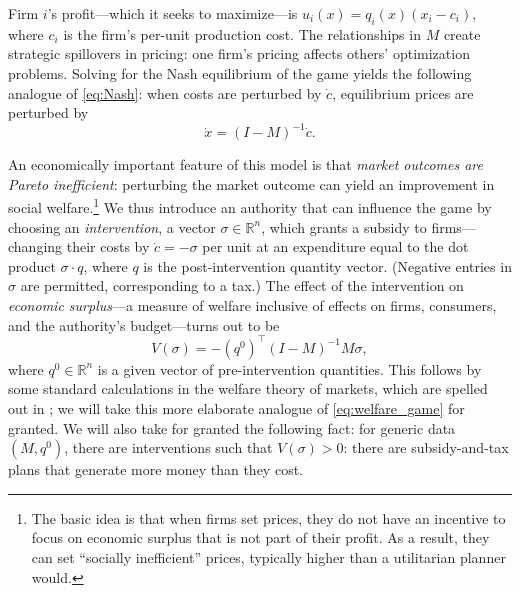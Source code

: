 \documentclass{notices}
\theoremstyle{definition}\newtheorem{problem}{Problem}
\theoremstyle{definition} \newtheorem{remark}{Remark}
\theoremstyle{definition} \newtheorem{claim}{Claim}
\theoremstyle{definition} \newtheorem{thm}{Theorem}
\theoremstyle{definition} \newtheorem*{thmNoNum}{Theorem}
\theoremstyle{definition} \newtheorem{definition}{Definition}
\theoremstyle{definition} \theoremstyle{remark}
\theoremstyle{definition} \newtheorem{note}{Note}
\theoremstyle{definition} \newtheorem{notation}{Notation}
\theoremstyle{definition} \theoremstyle{plain}
\theoremstyle{definition} \newtheorem{condition}{Condition}
\theoremstyle{definition} \newtheorem{lem}{Lemma}
\theoremstyle{definition} \newtheorem{corollary}{Corollary}
\theoremstyle{definition} \newtheorem{prop}{Proposition}
\theoremstyle{definition} \newtheorem{ax}{Axiom}
\theoremstyle{definition} \newtheorem{assumption}{Assumption}
\theoremstyle{definition} \newtheorem{example}{Example}
\theoremstyle{definition} \newtheorem{rmk}{Remark}
\theoremstyle{definition} \newtheorem{res}{Result}
\theoremstyle{definition} \newtheorem{que}{Question}
\theoremstyle{definition} \newtheorem{conjecture}{Conjecture}
\theoremstyle{definition}
\begin{document}
Firm $i$'s profit---which it seeks to maximize---is $ u_i(x) = q_i(x)(x_i-c_i),$ where $c_i$ is the firm's per-unit production cost. The relationships in $M$ create strategic spillovers in pricing: one firm's pricing affects others' optimization problems. Solving for the Nash equilibrium of the game yields the following analogue of \cref{eq:Nash}: when costs are perturbed by $\dot{c}$, equilibrium prices are perturbed by $$ \dot{x} = (I-M)^{-1} \dot{c}.$$ 

An economically important feature of this model is that \emph{market outcomes are Pareto inefficient}: perturbing the market outcome can yield an improvement in social welfare.\footnote{The basic idea is that when firms set prices, they do not have an incentive to focus on economic surplus that is not part of their profit. As a result, they can set ``socially inefficient'' prices, typically higher than a utilitarian planner would.} We thus introduce an authority that can influence the game by choosing an \emph{intervention}, a vector \( \sigma  \in \mathbb{R}^n\), which grants a subsidy to firms---changing  their costs by $\dot{c}=-\sigma$ per unit at an expenditure equal to the dot product $\sigma \cdot q$, where $q$ is the post-intervention quantity vector. (Negative entries in $\sigma$ are permitted, corresponding to a tax.)  The effect of the intervention on \emph{economic surplus}---a measure of welfare inclusive of effects on firms, consumers, and the authority's budget---turns out to be
\begin{equation}
V(\sigma) = -(q^0)^\top (I - M)^{-1} M \sigma, \label{eq:welfare_market}
\end{equation} where $q^0 \in \mathbb{R}^n$ is a given vector of pre-intervention quantities. This follows by some standard  calculations in the welfare theory of markets, which are spelled out in \cite{GaleottiGolubGoyalTalamasTamuz2026}; we will take this more elaborate analogue of \cref{eq:welfare_game} for granted. We will also take for granted the following fact: for generic data $(M, q^0)$, there are interventions such that $V(\sigma)>0$: there are subsidy-and-tax plans that generate more money than they cost.
\end{document}
